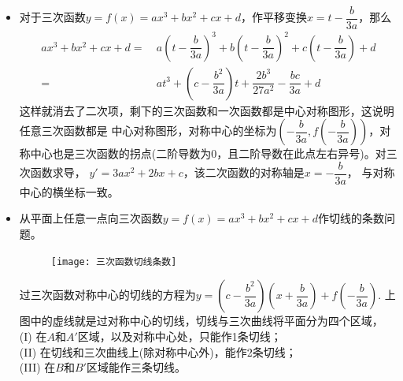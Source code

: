 \begin{itemize}[leftmargin=\inteval{\myitemleftmargin}pt,itemsep=
   \inteval{\myitemitempsep}pt,topsep=\inteval{\myitemtopsep}pt]
\item 对于三次函数$ y=f(x)=ax^3+bx^2+cx+d $，作平移变换$ x=t-\dfrac{b}{3a} $，那么
\begin{align*}
    ax^3+bx^2+cx+d=&\ a\left(t-\dfrac{b}{3a}\right)^3+b\left(t-\dfrac{b}{3a}
    \right)^2+c\left(t-\dfrac{b}{3a}\right)+d\\=&\ at^3+\left(c-\dfrac{b^2}{3a}
    \right)t+\dfrac{2b^3}{27a^2}-\dfrac{bc}{3a}+d
\end{align*}
这样就消去了二次项，剩下的三次函数和一次函数都是中心对称图形，这说明任意三次函数都是
中心对称图形，对称中心的坐标为$ \left(-\dfrac{b}{3a},f\left(-\dfrac{b}{3a}\right)\right) $，对称中心也是三次函数的拐点(二阶导数为0，且二阶导数在此点左右异号)。对三次函数求导，
$ y'=3ax^2+2bx+c $，该二次函数的对称轴是$ x=-\dfrac{b}{3a} $，
与对称中心的横坐标一致。

\item 从平面上任意一点向三次函数$ y=f(x)=ax^3+bx^2+cx+d $作切线的条数问题。
\begin{figure}[H]
    \centering
    \texttt{[image: 三次函数切线条数]}
\end{figure}

过三次函数对称中心的切线的方程为$ y=\left(c-\dfrac{b^2}{3a}
\right)\left(x+\dfrac{b}{3a}\right)+f\left(-\dfrac{b}{3a}\right) $. 上图中的虚线就是过对称中心的切线，切线与三次曲线将平面分为四个区域，\\
(I) 在$ A $和$ A' $区域，以及对称中心处，只能作1条切线；\\
(II) 在切线和三次曲线上(除对称中心外)，能作2条切线；\\
(III) 在$ B $和$ B' $区域能作三条切线。


\end{itemize}
